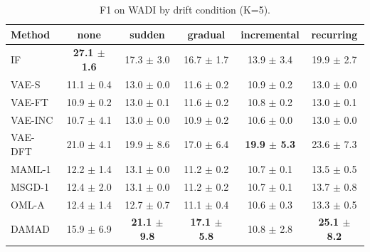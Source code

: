 \begin{table}[t]
\centering
\small
\caption{F1 on WADI by drift condition (K=5).}
\label{tab:drift_f1_wadi}
\begin{tabular}{lccccc}
\toprule
Method & none & sudden & gradual & incremental & recurring \\
\midrule
IF & \textbf{27.1 $\pm$ 1.6} & 17.3 $\pm$ 3.0 & 16.7 $\pm$ 1.7 & 13.9 $\pm$ 3.4 & 19.9 $\pm$ 2.7 \\
VAE-S & 11.1 $\pm$ 0.4 & 13.0 $\pm$ 0.0 & 11.6 $\pm$ 0.2 & 10.9 $\pm$ 0.2 & 13.0 $\pm$ 0.0 \\
VAE-FT & 10.9 $\pm$ 0.2 & 13.0 $\pm$ 0.1 & 11.6 $\pm$ 0.2 & 10.8 $\pm$ 0.2 & 13.0 $\pm$ 0.1 \\
VAE-INC & 10.7 $\pm$ 4.1 & 13.0 $\pm$ 0.0 & 10.9 $\pm$ 0.2 & 10.6 $\pm$ 0.0 & 13.0 $\pm$ 0.0 \\
VAE-DFT & 21.0 $\pm$ 4.1 & 19.9 $\pm$ 8.6 & 17.0 $\pm$ 6.4 & \textbf{19.9 $\pm$ 5.3} & 23.6 $\pm$ 7.3 \\
MAML-1 & 12.2 $\pm$ 1.4 & 13.1 $\pm$ 0.0 & 11.2 $\pm$ 0.2 & 10.7 $\pm$ 0.1 & 13.5 $\pm$ 0.5 \\
MSGD-1 & 12.4 $\pm$ 2.0 & 13.1 $\pm$ 0.0 & 11.2 $\pm$ 0.2 & 10.7 $\pm$ 0.1 & 13.7 $\pm$ 0.8 \\
OML-A & 12.4 $\pm$ 1.4 & 12.7 $\pm$ 0.7 & 11.1 $\pm$ 0.4 & 10.6 $\pm$ 0.3 & 13.3 $\pm$ 0.5 \\
DAMAD & 15.9 $\pm$ 6.9 & \textbf{21.1 $\pm$ 9.8} & \textbf{17.1 $\pm$ 5.8} & 10.8 $\pm$ 2.8 & \textbf{25.1 $\pm$ 8.2} \\
\bottomrule
\end{tabular}
\end{table}

